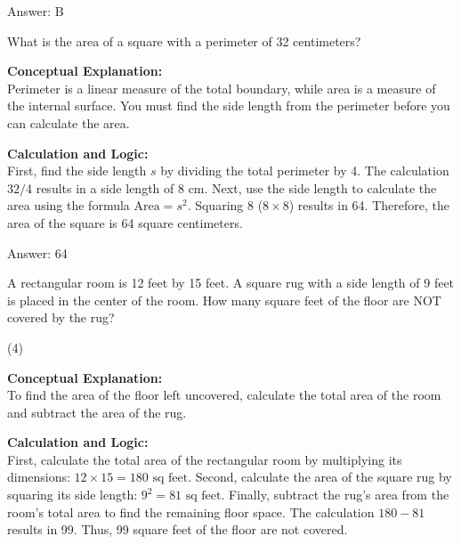 \documentclass[11pt,paper=a4,answers]{exam}
\begin{document}
\begin{questions}
\begin{solution}
\vspace{30pt}

Answer: \colorbox{yellow!100}{B}
\end{solution}

\vspace{60pt}

\question
What is the area of a square with a perimeter of 32 centimeters?

\begin{solution}
\textbf{Conceptual Explanation:} \\
Perimeter is a linear measure of the total boundary, while area is a measure of the internal surface. You must find the side length from the perimeter before you can calculate the area.

\vspace{30pt}

\textbf{Calculation and Logic:} \\
First, find the side length $s$ by dividing the total perimeter by 4. The calculation $32 / 4$ results in a side length of 8 cm. Next, use the side length to calculate the area using the formula $\text{Area} = s^2$. Squaring 8 ($8 \times 8$) results in 64. Therefore, the area of the square is 64 square centimeters.

\vspace{30pt}

Answer: \colorbox{yellow!100}{64}
\end{solution}

\vspace{60pt}

\question
A rectangular room is 12 feet by 15 feet. A square rug with a side length of 9 feet is placed in the center of the room. How many square feet of the floor are NOT covered by the rug?
\begin{tasks}(4)
\end{tasks}

\begin{solution}
\textbf{Conceptual Explanation:} \\
To find the area of the floor left uncovered, calculate the total area of the room and subtract the area of the rug.

\vspace{30pt}

\textbf{Calculation and Logic:} \\
First, calculate the total area of the rectangular room by multiplying its dimensions: $12 \times 15 = 180 \text{ sq feet}$. Second, calculate the area of the square rug by squaring its side length: $9^2 = 81 \text{ sq feet}$. Finally, subtract the rug's area from the room's total area to find the remaining floor space. The calculation $180 - 81$ results in 99. Thus, 99 square feet of the floor are not covered.


\end{solution}
\end{questions}
\end{document}
